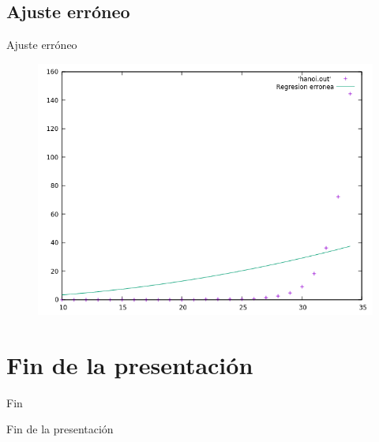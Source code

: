 \documentclass{beamer}
\begin{document}
\subsection{Ajuste erróneo}

\begin{frame}[fragile]{Ajuste erróneo}
\begin{figure}[H]
\centering
\includegraphics[scale=0.5]{ajuste_erroneo.png}
\end{figure}
\end{frame}

\section*{Fin de la presentación}
\begin{frame}{Fin}
\begin{center}
\huge{Fin de la presentación}
\end{center}
\end{frame}
\end{document}

